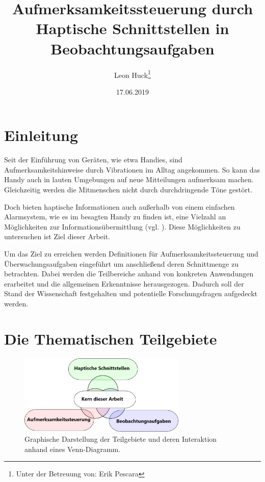 \documentclass{llncs}					%
\title{Aufmerksamkeitssteuerung durch Haptische Schnittstellen in Beobachtungsaufgaben}
\author{Leon Huck\thanks{Unter der Betreuung von: Erik Pescara}}
\institute{Karlsruher Institut für Technologie}
\date{17.06.2019}
\begin{document}
	
\maketitle

\begin{description}
	\item 
\end{description}

	

\newpage
\tableofcontents
\newpage

\clearpage
\section{Einleitung}

Seit der Einführung von Geräten, wie etwa Handies, sind Aufmerksamkeitshinweise durch Vibrationen im Alltag angekommen. So kann das Handy auch in lauten Umgebungen auf neue Mitteilungen aufmerksam machen. Gleichzeitig werden die Mitmenschen nicht durch durchdringende Töne gestört.

Doch bieten haptische Informationen auch außerhalb von einem einfachen Alarmsystem, wie es im besagten Handy zu finden ist, eine Vielzahl an Möglichkeiten zur Informationsübermittlung (vgl. \cite{10.2307/1705360}). Diese Möglichkeiten zu untersuchen ist Ziel dieser Arbeit.

Um das Ziel zu erreichen werden Definitionen für Aufmerksamkeitssteuerung und Überwachungsaufgaben eingeführt um anschließend deren Schnittmenge zu betrachten. Dabei werden die Teilbereiche anhand von konkreten Anwendungen erarbeitet und die allgemeinen Erkenntnisse herausgezogen.
Dadurch soll der Stand der Wissenschaft festgehalten und potentielle Forschungsfragen aufgedeckt werden.

\clearpage
\section{Die Thematischen Teilgebiete}

\begin{figure}[htbp]
	\begin{center}
		\includegraphics[width = 8cm]{Grafiken/Venn-Diagramm.png}
		\caption{Graphische Darstellung der Teilgebiete und deren Interaktion anhand eines Venn-Diagramm.}
		\label{Venn-Diagramm.png}
	\end{center}
\end{figure}
\end{document}
